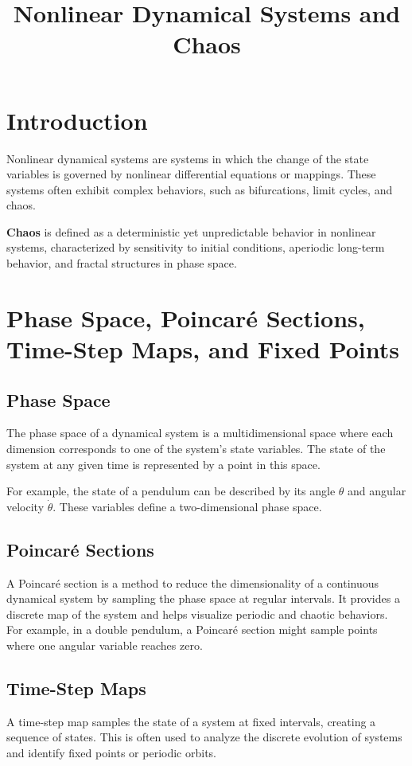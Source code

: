 \documentclass{article}
\title{Nonlinear Dynamical Systems and Chaos}
\author{}
\date{}
\begin{document}
\maketitle

\section{Introduction}

Nonlinear dynamical systems are systems in which the change of the state variables is governed by nonlinear differential equations or mappings. These systems often exhibit complex behaviors, such as bifurcations, limit cycles, and chaos.

\textbf{Chaos} is defined as a deterministic yet unpredictable behavior in nonlinear systems, characterized by sensitivity to initial conditions, aperiodic long-term behavior, and fractal structures in phase space.

\section{Phase Space, Poincar\'{e} Sections, Time-Step Maps, and Fixed Points}

\subsection{Phase Space}
The phase space of a dynamical system is a multidimensional space where each dimension corresponds to one of the system's state variables. The state of the system at any given time is represented by a point in this space. 

For example, the state of a pendulum can be described by its angle $\theta$ and angular velocity $\dot{\theta}$. These variables define a two-dimensional phase space.

\subsection{Poincar\'{e} Sections}
A Poincar\'{e} section is a method to reduce the dimensionality of a continuous dynamical system by sampling the phase space at regular intervals. It provides a discrete map of the system and helps visualize periodic and chaotic behaviors. For example, in a double pendulum, a Poincar\'{e} section might sample points where one angular variable reaches zero.

\subsection{Time-Step Maps}
A time-step map samples the state of a system at fixed intervals, creating a sequence of states. This is often used to analyze the discrete evolution of systems and identify fixed points or periodic orbits.
\end{document}
